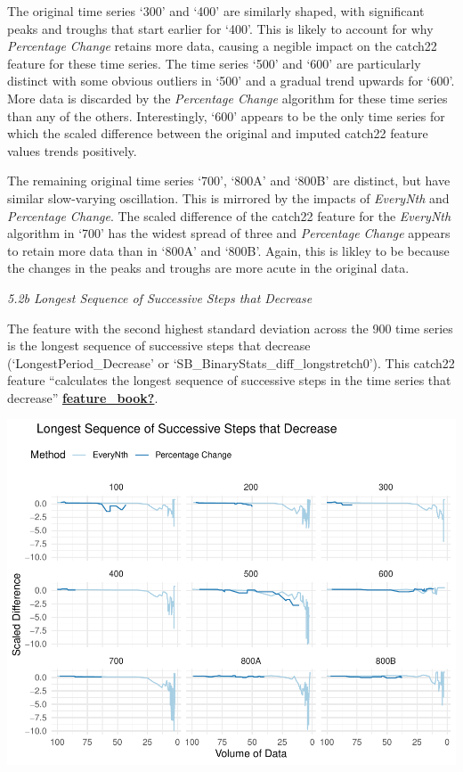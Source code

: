 \documentclass{article}
\begin{document}
The original time series `300' and `400' are similarly shaped, with
significant peaks and troughs that start earlier for `400'. This is
likely to account for why \emph{Percentage Change} retains more data,
causing a negible impact on the catch22 feature for these time series.
The time series `500' and `600' are particularly distinct with some
obvious outliers in `500' and a gradual trend upwards for `600'. More
data is discarded by the \emph{Percentage Change} algorithm for these
time series than any of the others. Interestingly, `600' appears to be
the only time series for which the scaled difference between the
original and imputed catch22 feature values trends positively.

The remaining original time series `700', `800A' and `800B' are
distinct, but have similar slow-varying oscillation. This is mirrored by
the impacts of \emph{EveryNth} and \emph{Percentage Change}. The scaled
difference of the catch22 feature for the \emph{EveryNth} algorithm in
`700' has the widest spread of three and \emph{Percentage Change}
appears to retain more data than in `800A' and `800B'. Again, this is
likley to be because the changes in the peaks and troughs are more acute
in the original data.

\emph{5.2b Longest Sequence of Successive Steps that Decrease}

The feature with the second highest standard deviation across the 900
time series is the longest sequence of successive steps that decrease
(`LongestPeriod\_Decrease' or `SB\_BinaryStats\_diff\_longstretch0').
This catch22 feature ``calculates the longest sequence of successive
steps in the time series that decrease''
\protect\hyperlink{ref-feature_book}{\textbf{feature\_book?}}.

\includegraphics{210431461_CSC8639_Dissertation_files/figure-latex/LongestDecrease-1.pdf}
\end{document}
